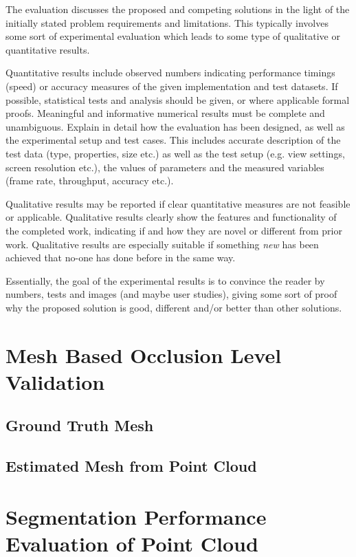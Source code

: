 \documentclass[11pt, a4paper,oneside,chapterprefix=false]{scrbook}
\begin{document}
The evaluation discusses the proposed and competing solutions in the light of the initially stated problem requirements and limitations. This typically involves some sort of experimental evaluation which leads to some type of qualitative or quantitative results.

Quantitative results include observed numbers indicating performance timings (speed) or accuracy measures of the given implementation and test datasets. If possible, statistical tests and analysis should be given, or where applicable formal proofs. Meaningful and informative numerical results must be complete and unambiguous. Explain in detail how the evaluation has been designed, as well as the experimental setup and test cases. This includes accurate description of the test data (type, properties, size etc.) as well as the test setup (e.g. view settings, screen resolution etc.), the values of parameters and the measured variables (frame rate, throughput, accuracy etc.).

Qualitative results may be reported if clear quantitative measures are not feasible or applicable. Qualitative results clearly show the features and functionality of the completed work, indicating if and how they are novel or different from prior work. Qualitative results are especially suitable if something \emph{new} has been achieved that no-one has done before in the same way.

Essentially, the goal of the experimental results is to convince the reader by numbers, tests and images (and maybe user studies), giving some sort of proof why the proposed solution is good, different and/or better than other solutions.

\section{Mesh Based Occlusion Level Validation}

\subsection{Ground Truth Mesh}


\subsection{Estimated Mesh from Point Cloud}

\section{Segmentation Performance Evaluation of Point Cloud}
\end{document}
